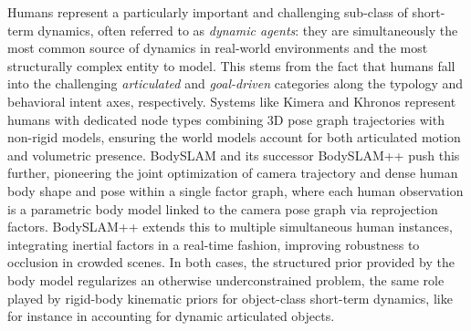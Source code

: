 
Humans represent a particularly important and challenging sub-class of short-term dynamics, often referred to as \textit{dynamic agents}: they are simultaneously the most common source of dynamics in real-world environments and the most structurally complex entity to model. This stems from the fact that humans fall into the challenging \textit{articulated} and \textit{goal-driven} categories along the typology and behavioral intent axes, respectively.
Systems like Kimera \cite{rosinol_kimera_2021} and Khronos \cite{schmid_khronos_2024} represent humans with dedicated node types combining 3D pose graph trajectories with non-rigid models, ensuring the world models account for both articulated motion and volumetric presence. 
BodySLAM \cite{henning_bodyslam_2022} and its successor BodySLAM++ \cite{henning_bodyslam_2023} push this further, pioneering the joint optimization of camera trajectory and dense human body shape and pose within a single factor graph, where each human observation is a parametric body model linked to the camera pose graph via reprojection factors. 
BodySLAM++ \cite{henning_bodyslam_2023} extends this to multiple simultaneous human instances, integrating inertial factors in a real-time fashion, improving robustness to occlusion in crowded scenes. 
In both cases, the structured prior provided by the body model regularizes an otherwise underconstrained problem, the same role played by rigid-body kinematic priors for object-class short-term dynamics, like for instance in \cite{qiu2022airdos} accounting for dynamic articulated objects.

